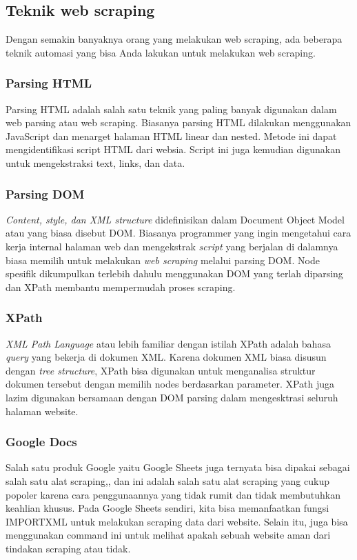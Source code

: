 \subsection{Teknik web scraping}
Dengan semakin banyaknya orang yang melakukan web scraping, ada beberapa teknik automasi yang bisa Anda lakukan untuk melakukan web scraping.

\subsubsection{Parsing HTML}

Parsing HTML adalah salah satu teknik yang paling banyak digunakan dalam web parsing atau web scraping. Biasanya parsing HTML dilakukan menggunakan JavaScript dan menarget halaman HTML linear dan nested. Metode ini dapat mengidentifikasi script HTML dari websia. Script ini juga kemudian digunakan untuk mengekstraksi text, links, dan data.

\subsubsection{Parsing DOM}

\textit{Content, style, dan XML structure} didefinisikan dalam Document Object Model atau yang biasa disebut DOM. Biasanya programmer yang ingin mengetahui cara kerja internal halaman web dan mengekstrak \textit{script} yang berjalan di dalamnya biasa memilih untuk melakukan \textit{web scraping} melalui parsing DOM. Node spesifik dikumpulkan terlebih dahulu menggunakan DOM yang terlah diparsing dan XPath membantu mempermudah proses scraping.

\subsubsection{XPath}

\textit{XML Path Language} atau lebih familiar dengan istilah XPath adalah bahasa \textit{query} yang bekerja di dokumen XML. Karena dokumen XML biasa disusun dengan \textit{tree structure}, XPath bisa digunakan untuk menganalisa struktur dokumen tersebut dengan memilih nodes berdasarkan parameter. XPath juga lazim digunakan bersamaan dengan DOM parsing dalam mengesktrasi seluruh halaman website.

\subsubsection{Google Docs}

Salah satu produk Google yaitu Google Sheets juga ternyata bisa dipakai sebagai salah satu alat scraping,, dan ini adalah salah satu alat scraping yang cukup popoler karena cara penggunaannya yang tidak rumit dan tidak membutuhkan keahlian khusus. Pada Google Sheets sendiri, kita bisa memanfaatkan fungsi IMPORTXML untuk melakukan scraping data dari website. Selain itu, juga bisa menggunakan command ini untuk melihat apakah sebuah website aman dari tindakan scraping atau tidak.
